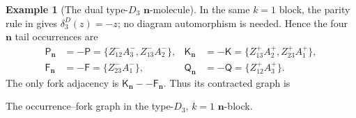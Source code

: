 \documentclass[11pt]{article}
\theoremstyle{definition}
\newtheorem{example}[theorem]{Example}
\theoremstyle{remark}
\newcommand{\ngraph}{\mathbf n}
\begin{document}
\begin{example}[The dual type-$D_3$ $\ngraph$-molecule]
\label{ex:D3-n-molecule}
In the same $k=1$ block, the parity rule in
\cite[(3.26)]{MZGelfand} gives $\delta_3^D(z)=-z$; no diagram
automorphism is needed.  Hence the four $\ngraph$ tail occurrences are
\begin{align*}
 \mathsf P_{\ngraph}&=-\mathsf P
   =\{Z_{12}^-A_3^-,Z_{13}^-A_2^-\},
 &\mathsf K_{\ngraph}&=-\mathsf K
   =\{Z_{13}^+A_2^+,Z_{23}^+A_1^+\},\\
 \mathsf F_{\ngraph}&=-\mathsf F=\{Z_{23}^-A_1^-\},
 &\mathsf Q_{\ngraph}&=-\mathsf Q=\{Z_{12}^+A_3^+\}.
\end{align*}
The only fork adjacency is
$\mathsf K_{\ngraph}--\mathsf F_{\ngraph}$.  Thus its contracted graph
is
\begin{center}

\smallskip
{\small The occurrence--fork graph in the type-$D_3$, $k=1$
$\ngraph$-block.}
\end{center}


\end{example}
\end{document}
